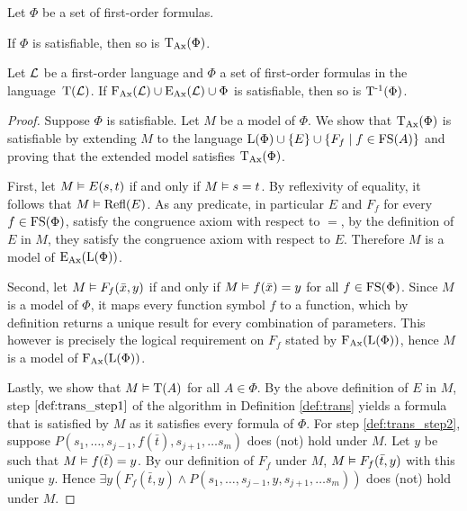 \begin{prop}
	\label{prop:transSatEquiv}
	Let $\Phi$ be a set of first-order formulas.
	\begin{compactenum}
		\item If $\Phi$ is satisfiable, then so is $\operatorname{\operatorname{T}_{Ax}}(\Phi)$.
			\label{prop:transSatEquiv1}
		\item Let $\operatorname{\mathcal{L}}$ be a first-order language and $\Phi$ a set of first-order formulas in the language~$\operatorname{T}(\operatorname{\mathcal{L}})$.
			If $\operatorname{F_{Ax}}(\operatorname{\mathcal{L}}) \cup \operatorname{E_{Ax}}(\operatorname{\mathcal{L}}) \cup \Phi $ is satisfiable, then so is $\operatorname{T^{-1}}(\Phi)$.
			\label{prop:transSatEquiv2}
	\end{compactenum}
\end{prop}
\begin{proof}
	Suppose $\Phi$ is satisfiable.
	Let $M$ be a model of $\Phi$.
	We show that $\operatorname{\operatorname{T}_{Ax}}(\Phi)$ is satisfiable by extending $M$ to the language $\operatorname{L}(\Phi)\cup\{E\}\cup\{F_f\mid f \in \operatorname{FS}(A)\}$ and proving that the extended model satisfies $\operatorname{\operatorname{T}_{Ax}}(\Phi)$.

	First, let $M \vDash E(s, t)$ if and only if $M \vDash s = t$.
	By reflexivity of equality, it follows that $M \vDash \operatorname{Refl}(E)$.
	As any predicate, in particular $E$ and $F_f$ for every $f \in \operatorname{FS}(\Phi)$, satisfy the congruence axiom with respect to $=$, by the definition of $E$ in $M$, they satisfy the congruence axiom with respect to $E$.
	Therefore $M$ is a model of $\operatorname{E_{Ax}}(\operatorname{L}(\Phi))$.

	Second, let $M \vDash F_f(\bar x, y)$ if and only if $M \vDash f(\bar x) = y$ for all $f \in \operatorname{FS}(\Phi)$. 
	Since $M$ is a model of $\Phi$, it maps every function symbol $f$ to a function, which by definition returns a unique result for every combination of parameters.
	This however is precisely the logical requirement on $F_f$ stated by $\operatorname{F_{Ax}}(\operatorname{L}(\Phi))$,   
	hence $M$ is a model of $\operatorname{F_{Ax}}(\operatorname{L}(\Phi))$.

	Lastly, we show that $M \vDash \operatorname{T}(A)$ for all $A \in \Phi$.
	By the above definition of $E$ in $M$, step $\ref{def:trans_step1}$ of the algorithm in Definition \ref{def:trans} yields a formula that is satisfied by $M$ as it satisfies every formula of $\Phi$.
	For step \ref{def:trans_step2}, suppose $P(s_1, \ldots, s_{j-1}, f(\bar t),\allowbreak s_{j+1}, \ldots s_m)$ does (not) hold under $M$.
	Let $y$ be such that $M \vDash f(\bar t)=y$.
	By our definition of $F_f$ under $M$, $M\vDash F_f(\bar t, y)$ with this unique $y$.
	Hence $\exists y (F_f(\bar t, y) \land P(s_1, \ldots, s_{j-1}, y, \allowbreak s_{j+1}, \ldots s_m))$ does (not) hold under $M$.



\end{proof}
